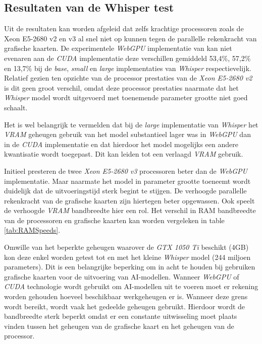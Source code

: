
\subsection{Resultaten van de Whisper test}

Uit de resultaten kan worden afgeleid dat zelfs krachtige processoren zoals de Xeon E5-2680 v2 en v3 al snel niet op kunnen tegen de parallelle rekenkracht van grafische kaarten. De experimentele \textit{WebGPU} implementatie van \textcite{Fleetwood2024} kan niet evenaren aan de \textit{CUDA} implementatie deze verschillen gemiddeld 53,4\%, 57,2\% en 13,7\% bij de \textit{base}, \textit{small} en \textit{large} implementaties van \textit{Whisper} respectievelijk. Relatief gezien ten opzichte van de processor prestaties van de \textit{Xeon E5-2680 v2} is dit geen groot verschil, omdat deze processor prestaties naarmate dat het \textit{Whisper} model wordt uitgevoerd met toenemende parameter grootte niet goed schaalt.

\bigbreak{}

Het is wel belangrijk te vermelden dat bij de \textit{large} implementatie van \textit{Whisper} het \textit{VRAM} geheugen gebruik van het model substantieel lager was in \textit{WebGPU} dan in de \textit{CUDA} implementatie en dat hierdoor het model mogelijks een andere kwantisatie wordt toegepast. Dit kan leiden tot een verlaagd \textit{VRAM} gebruik.

\bigbreak{}

Initieel presteren de twee \textit{Xeon E5-2680 v3} processoren beter dan de \textit{WebGPU} implementatie. Maar naarmate het model in parameter grootte toeneemt wordt duidelijk dat de uitvoeringstijd sterk begint te stijgen. De verhoogde parallelle rekenkracht van de grafische kaarten zijn hiertegen beter opgewassen. Ook speelt de verhoogde \textit{VRAM} bandbreedte hier een rol. Het verschil in RAM bandbreedte van de processoren en grafische kaarten kan worden vergeleken in table \ref{tab:RAMSpeeds}. 

\bigbreak{}

Omwille van het beperkte geheugen waarover de \textit{GTX 1050 Ti} beschikt (4GB) kon deze enkel worden getest tot en met het kleine \textit{Whisper} model (244 miljoen parameters). Dit is een belangrijke beperking om in acht te houden bij gebruiken grafische kaarten voor de uitvoering van AI-modellen. Wanneer \textit{WebGPU} of \textit{CUDA} technologie wordt gebruikt om AI-modellen uit te voeren moet er rekening worden gehouden hoeveel beschikbaar werkgeheugen er is. Wanneer deze grens wordt bereikt, wordt vaak het gedeelde geheugen gebruikt. Hierdoor wordt de bandbreedte sterk beperkt omdat er een constante uitwisseling moet plaats vinden tussen het geheugen van de grafische kaart en het geheugen van de processor.

